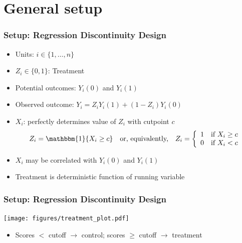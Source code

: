 \documentclass[table, xcolor = {dvipsnames}, 9pt]{beamer}
\theoremstyle{plain}
\newcommand{\bh}[1]{{\color{blue}{#1}}}
\begin{document}
\section{General setup}
\begin{frame}
\frametitle{Setup: Regression Discontinuity Design} 
\begin{itemize} \vfill
\item Units: $i \in \{1, \ldots, n\}$
\item $Z_i \in \{0,1\}$: Treatment
\item Potential outcomes: $Y_i(0)$ and $Y_i(1)$
\item Observed outcome: $Y_i = Z_i Y_i(1) + (1-Z_i) Y_i(0)$ 
\item $X_i$: \bh{Running variable} perfectly determines value of $Z_i$ with cutpoint $c$
\begin{equation*}
Z_i = \mathbbm{1}\{X_i \geq c\} \quad \text{or, equivalently,} \quad Z_i = \left\{
\begin{array}{ll}
1 & \mbox{if $X_i \geq c$}\\
0 & \mbox{if $X_i < c$}
\end{array}
\right.
\end{equation*} \vfill
\item $X_i$ may be correlated with $Y_i(0)$ and $Y_i(1)$ \vfill
\item Treatment is deterministic function of running variable \vfill
\end{itemize} \vfill
\end{frame}
\begin{frame}
\frametitle{Setup: Regression Discontinuity Design} 
\vfill
\begin{center}
\texttt{[image: figures/treatment\_plot.pdf]}
\end{center}
\vfill
\begin{itemize} \vfill
\item Scores $<$ cutoff $\rightarrow$ control; scores $\geq$ cutoff $\rightarrow$ treatment \vfill
\end{itemize} \vfill
\end{frame}
\end{document}
